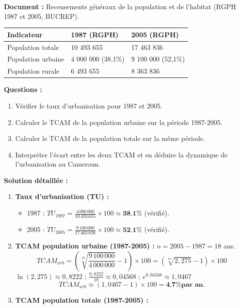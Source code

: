 \documentclass[11pt]{article}
\begin{document}
\begin{exoresolu}
\textbf{Document :} Recensements généraux de la population et de l'habitat (RGPH 1987 et 2005, BUCREP).
\begin{center}
\begin{tabularx}{\linewidth}{|l|X|X|}\hline
\textbf{Indicateur} & \textbf{1987 (RGPH)} & \textbf{2005 (RGPH)} \\ \hline
Population totale & 10 493 655 & 17 463 836 \\ \hline
Population urbaine & 4 000 000 (38,1\%) & 9 100 000 (52,1\%) \\ \hline
Population rurale & 6 493 655 & 8 363 836 \\ \hline
\end{tabularx}
\end{center}
\textbf{Questions :}
\begin{enumerate}
    \item Vérifier le taux d'urbanisation pour 1987 et 2005.
    \item Calculer le TCAM de la population urbaine sur la période 1987-2005.
    \item Calculer le TCAM de la population totale sur la même période.
    \item Interpréter l'écart entre les deux TCAM et en déduire la dynamique de l'urbanisation au Cameroun.
\end{enumerate}
\tcblower
\textbf{Solution détaillée :}
\begin{enumerate}
    \item \textbf{Taux d'urbanisation (TU) :}
    \begin{itemize}
        \item 1987 : $TU_{1987} = \frac{4\,000\,000}{10\,493\,655} \times 100 \approx \textbf{38,1\%}$ (vérifié).
        \item 2005 : $TU_{2005} = \frac{9\,100\,000}{17\,463\,836} \times 100 \approx \textbf{52,1\%}$ (vérifié).
    \end{itemize}
    \item \textbf{TCAM population urbaine (1987-2005) :}
    $n = 2005 - 1987 = 18$ ans.
    \[TCAM_{urb} = \left( \sqrt[18]{\frac{9\,100\,000}{4\,000\,000}} - 1 \right) \times 100 = \left( \sqrt[18]{2,275} - 1 \right) \times 100\]
    $\ln(2,275) \approx 0,8222$ ; $\frac{0,8222}{18} \approx 0,04568$ ; $e^{0,04568} \approx 1,0467$
    \[TCAM_{urb} \approx (1,0467 - 1) \times 100 = \textbf{4,7\% par an}.\]
    \item \textbf{TCAM population totale (1987-2005) :}

\end{enumerate}
\end{exoresolu}
\end{document}

